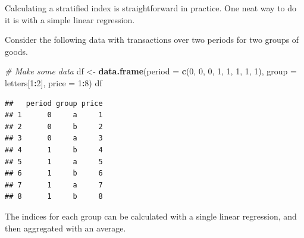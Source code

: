 \documentclass[]{article}
\newenvironment{Shaded}{\begin{snugshade}}{\end{snugshade}}
\newcommand{\CommentTok}[1]{\textcolor[rgb]{0.56,0.35,0.01}{\textit{#1}}}
\newcommand{\DataTypeTok}[1]{\textcolor[rgb]{0.13,0.29,0.53}{#1}}
\newcommand{\DecValTok}[1]{\textcolor[rgb]{0.00,0.00,0.81}{#1}}
\newcommand{\KeywordTok}[1]{\textcolor[rgb]{0.13,0.29,0.53}{\textbf{#1}}}
\newcommand{\NormalTok}[1]{#1}
\newcommand{\OperatorTok}[1]{\textcolor[rgb]{0.81,0.36,0.00}{\textbf{#1}}}
\newcommand{\StringTok}[1]{\textcolor[rgb]{0.31,0.60,0.02}{#1}}
\begin{document}
Calculating a stratified index is straightforward in practice. One neat way to do it is with a simple linear regression.

Consider the following data with transactions over two periods for two groups of goods.

\begin{Shaded}
\begin{Highlighting}[]
\CommentTok{# Make some data}
\NormalTok{df <-}\StringTok{ }\KeywordTok{data.frame}\NormalTok{(}\DataTypeTok{period =} \KeywordTok{c}\NormalTok{(}\DecValTok{0}\NormalTok{, }\DecValTok{0}\NormalTok{, }\DecValTok{0}\NormalTok{, }\DecValTok{1}\NormalTok{, }\DecValTok{1}\NormalTok{, }\DecValTok{1}\NormalTok{, }\DecValTok{1}\NormalTok{, }\DecValTok{1}\NormalTok{), }
                 \DataTypeTok{group =}\NormalTok{ letters[}\DecValTok{1}\OperatorTok{:}\DecValTok{2}\NormalTok{],}
                 \DataTypeTok{price =} \DecValTok{1}\OperatorTok{:}\DecValTok{8}\NormalTok{)}
\NormalTok{df}
\end{Highlighting}
\end{Shaded}

\begin{verbatim}
##   period group price
## 1      0     a     1
## 2      0     b     2
## 3      0     a     3
## 4      1     b     4
## 5      1     a     5
## 6      1     b     6
## 7      1     a     7
## 8      1     b     8
\end{verbatim}

The indices for each group can be calculated with a single linear regression, and then aggregated with an average.

\begin{Shaded}
\end{Shaded}
\end{document}
